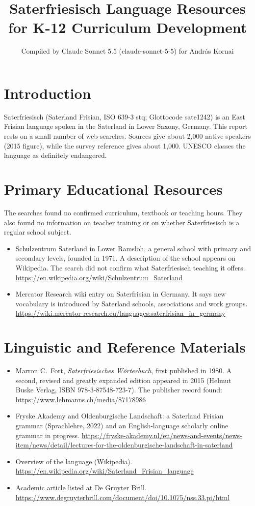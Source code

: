 \documentclass[12pt]{article}
\title{Saterfriesisch Language Resources for K-12 Curriculum Development}
\author{Compiled by Claude Sonnet 5.5 (claude-sonnet-5-5) for Andr\'as Kornai}
\date{}
\begin{document}
\maketitle

\section{Introduction}
Saterfriesisch (Saterland Frisian, ISO 639-3 stq; Glottocode sate1242) is an East Frisian language spoken in the Saterland in Lower Saxony, Germany. This report rests on a small number of web searches. Sources give about 2,000 native speakers (2015 figure), while the survey reference gives about 1,000. UNESCO classes the language as definitely endangered.

\section{Primary Educational Resources}
The searches found no confirmed curriculum, textbook or teaching hours. They also found no information on teacher training or on whether Saterfriesisch is a regular school subject.
\begin{itemize}
\item Schulzentrum Saterland in Lower Ramsloh, a general school with primary and secondary levels, founded in 1971. A description of the school appears on Wikipedia. The search did not confirm what Saterfriesisch teaching it offers. \url{https://en.wikipedia.org/wiki/Schulzentrum_Saterland}
\item Mercator Research wiki entry on Saterfrisian in Germany. It says new vocabulary is introduced by Saterland schools, associations and work groups. \url{https://wiki.mercator-research.eu/languages:saterfrisian_in_germany}
\end{itemize}

\section{Linguistic and Reference Materials}
\begin{itemize}
\item Marron C.\ Fort, \emph{Saterfriesisches W\"orterbuch}, first published in 1980. A second, revised and greatly expanded edition appeared in 2015 (Helmut Buske Verlag, ISBN 978-3-87548-723-7). The publisher record found: \url{https://www.lehmanns.ch/media/87178986}
\item Fryske Akademy and Oldenburgische Landschaft: a Saterland Frisian grammar (Sprachlehre, 2022) and an English-language scholarly online grammar in progress. \url{https://fryske-akademy.nl/en/news-and-events/news-item/news/detail/lectures-for-the-oldenburgische-landschaft-in-saterland}
\item Overview of the language (Wikipedia). \url{https://en.wikipedia.org/wiki/Saterland_Frisian_language}
\item Academic article listed at De Gruyter Brill. \url{https://www.degruyterbrill.com/document/doi/10.1075/nss.33.pi/html}
\end{itemize}
\end{document}
